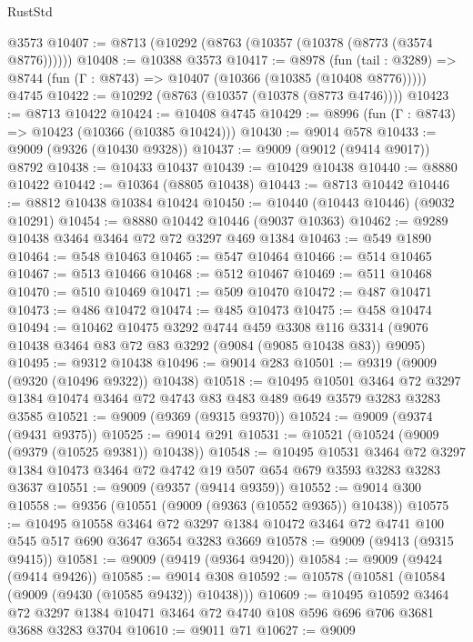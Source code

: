 \begin{lexlean}{RustStd}
\begin{coremodule}
    @3573
@10407 := @8713 (@10292 (@8763 (@10357 (@10378 (@8773 (@3574 @8776))))))
@10408 := @10388 @3573
@10417 := @8978
    (fun (tail : @3289) => @8744 (fun (Γ : @8743) => @10407 (@10366 (@10385 (@10408 @8776)))))
    @4745
@10422 := @10292 (@8763 (@10357 (@10378 (@8773 @4746))))
@10423 := @8713 @10422
@10424 := @10408 @4745
@10429 := @8996 (fun (Γ : @8743) => @10423 (@10366 (@10385 @10424)))
@10430 := @9014 @578
@10433 := @9009 (@9326 (@10430 @9328))
@10437 := @9009 (@9012 (@9414 @9017)) @8792
@10438 := @10433 @10437
@10439 := @10429 @10438
@10440 := @8880 @10422
@10442 := @10364 (@8805 @10438)
@10443 := @8713 @10442
@10446 := @8812 @10438 @10384 @10424
@10450 := @10440 (@10443 @10446) (@9032 @10291)
@10454 := @8880 @10442 @10446 (@9037 @10363)
@10462 := @9289 @10438 @3464 @3464 @72 @72 @3297 @469 @1384
@10463 := @549 @1890
@10464 := @548 @10463
@10465 := @547 @10464
@10466 := @514 @10465
@10467 := @513 @10466
@10468 := @512 @10467
@10469 := @511 @10468
@10470 := @510 @10469
@10471 := @509 @10470
@10472 := @487 @10471
@10473 := @486 @10472
@10474 := @485 @10473
@10475 := @458 @10474
@10494 := @10462
    @10475
    @3292
    @4744
    @459
    @3308
    @116
    @3314
    (@9076 @10438 @3464 @83 @72 @83 @3292 (@9084 (@9085 @10438 @83)) @9095)
@10495 := @9312 @10438
@10496 := @9014 @283
@10501 := @9319 (@9009 (@9320 (@10496 @9322)) @10438)
@10518 := @10495
    @10501
    @3464
    @72
    @3297
    @1384
    @10474
    @3464
    @72
    @4743
    @83
    @483
    @489
    @649
    @3579
    @3283
    @3283
    @3585
@10521 := @9009 (@9369 (@9315 @9370))
@10524 := @9009 (@9374 (@9431 @9375))
@10525 := @9014 @291
@10531 := @10521 (@10524 (@9009 (@9379 (@10525 @9381)) @10438))
@10548 := @10495
    @10531
    @3464
    @72
    @3297
    @1384
    @10473
    @3464
    @72
    @4742
    @19
    @507
    @654
    @679
    @3593
    @3283
    @3283
    @3637
@10551 := @9009 (@9357 (@9414 @9359))
@10552 := @9014 @300
@10558 := @9356 (@10551 (@9009 (@9363 (@10552 @9365)) @10438))
@10575 := @10495
    @10558
    @3464
    @72
    @3297
    @1384
    @10472
    @3464
    @72
    @4741
    @100
    @545
    @517
    @690
    @3647
    @3654
    @3283
    @3669
@10578 := @9009 (@9413 (@9315 @9415))
@10581 := @9009 (@9419 (@9364 @9420))
@10584 := @9009 (@9424 (@9414 @9426))
@10585 := @9014 @308
@10592 := @10578 (@10581 (@10584 (@9009 (@9430 (@10585 @9432)) @10438)))
@10609 := @10495
    @10592
    @3464
    @72
    @3297
    @1384
    @10471
    @3464
    @72
    @4740
    @108
    @596
    @696
    @706
    @3681
    @3688
    @3283
    @3704
@10610 := @9011 @71
@10627 := @9009

\end{coremodule}
\end{lexlean}
